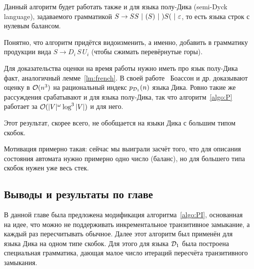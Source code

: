 \begin{note}
  Данный алгоритм будет работать также и для языка полу-Дика (semi-Dyck language), задаваемого грамматикой $S \rightarrow SS ~|~ ( S ) ~|~ ) S ( ~|~ \varepsilon$, то есть языка строк с нулевым балансом.

  Понятно, что алгоритм придётся видоизменить, а именно, добавить в грамматику продукции вида $S \to D_i\, S\, U_i$ (чтобы сжимать перевёрнутые горы). 

  Для доказательства оценки на время работы нужно иметь про язык полу-Дика факт, аналогичный лемме~\ref{lm:french}. В своей работе~\cite{Boasson1981} Боассон и др. доказывают оценку в $\mathcal{O}(n^3)$ на рациональный индекс $p_{\mathcal{D}_1}(n)$ языка Дика. Ровно такие же рассуждения срабатывают и для языка полу-Дика, так что алгоритм~\ref{algo:P} работает за $\mathcal{O}(|V|^{\omega} \log^3 |V|)$ и для него.
\end{note}

\begin{note}
  Этот результат, скорее всего, не обобщается на языки Дика с большим типом скобок. 

  Мотивация примерно такая: сейчас мы выиграли засчёт того, что для описания состояния автомата нужно примерно одно число (баланс), но для большего типа скобок нужен уже весь стек.
\end{note}

\subsection{Выводы и результаты по главе}

В данной главе была предложена модификация алгоритма~\ref{algo:PI}, основанная на идее, что можно не поддерживать инкрементальное транзитивное замыкание, а каждый раз пересчитывать обычное. Далее этот алгоритм был применён для языка Дика на одном типе скобок. Для этого для языка $\mathcal{D}_1$ была построена специальная грамматика, дающая малое число итераций пересчёта транзитивного замыкания.


